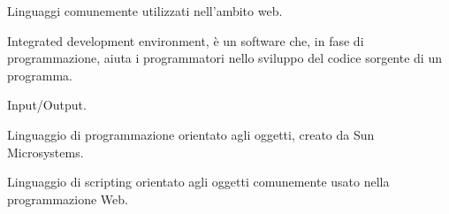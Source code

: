 
\begin{itemize}


Linguaggi comunemente utilizzati nell'ambito web.

\end{itemize}


\begin{itemize}


Integrated development environment,  è un software che, in fase di programmazione, aiuta i programmatori nello sviluppo del codice sorgente di un programma.


Input/Output.

\end{itemize}


\begin{itemize}


Linguaggio di programmazione orientato agli oggetti, creato da Sun Microsystems.


Linguaggio di scripting orientato agli oggetti comunemente usato nella programmazione Web.

\end{itemize}


